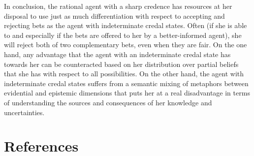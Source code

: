 \documentclass[11pt]{article}
\begin{document}
In conclusion, the rational agent with a sharp credence has resources
at her disposal to use just as much differentiation with respect to
accepting and rejecting bets as the agent with indeterminate credal
states. Often (if she is able to and especially if the bets are
offered to her by a better-informed agent), she will reject both of
two complementary bets, even when they are fair. On the one hand, any
advantage that the agent with an indeterminate credal state has
towards her can be counteracted based on her distribution over partial
beliefs that she has with respect to all possibilities. On the other
hand, the agent with indeterminate credal states suffers from a
semantic mixing of metaphors between evidential and epistemic
dimensions that puts her at a real disadvantage in terms of
understanding the sources and consequences of her knowledge and
uncertainties.

\section{References} 
\label{References}

 

\end{document}
